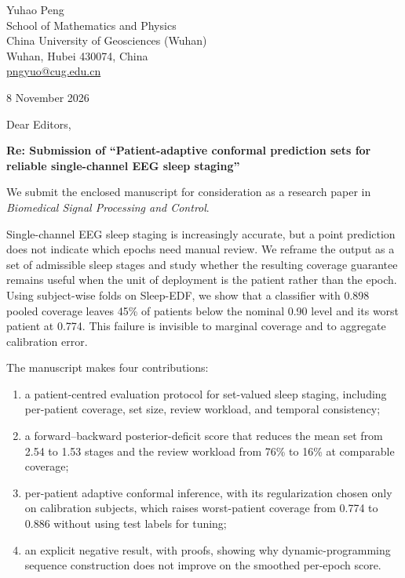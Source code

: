 \documentclass[10pt]{letter}
\begin{document}
\pagestyle{empty}

\begin{flushright}
Yuhao Peng\\
School of Mathematics and Physics\\
China University of Geosciences (Wuhan)\\
Wuhan, Hubei 430074, China\\
\href{mailto:pngyuo@cug.edu.cn}{pngyuo@cug.edu.cn}
\end{flushright}

\vspace{1em}
8 November 2026

\vspace{1em}
Dear Editors,

\textbf{Re: Submission of ``Patient-adaptive conformal prediction sets for
reliable single-channel EEG sleep staging''}

We submit the enclosed manuscript for consideration as a research paper in
\emph{Biomedical Signal Processing and Control}.

Single-channel EEG sleep staging is increasingly accurate, but a point
prediction does not indicate which epochs need manual review. We reframe the
output as a set of admissible sleep stages and study whether the resulting
coverage guarantee remains useful when the unit of deployment is the patient
rather than the epoch. Using subject-wise folds on Sleep-EDF, we show that a
classifier with 0.898 pooled coverage leaves 45\% of patients below the
nominal 0.90 level and its worst patient at 0.774. This failure is invisible
to marginal coverage and to aggregate calibration error.

The manuscript makes four contributions:

\begin{enumerate}[leftmargin=1.2em,itemsep=0.08em,topsep=0.2em]
\item a patient-centred evaluation protocol for set-valued sleep staging,
including per-patient coverage, set size, review workload, and temporal
consistency;
\item a forward--backward posterior-deficit score that reduces the mean set
from 2.54 to 1.53 stages and the review workload from 76\% to 16\% at
comparable coverage;
\item per-patient adaptive conformal inference, with its regularization
chosen only on calibration subjects, which raises worst-patient coverage from
0.774 to 0.886 without using test labels for tuning;
\item an explicit negative result, with proofs, showing why dynamic-programming
sequence construction does not improve on the smoothed per-epoch score.
\end{enumerate}
\end{document}
